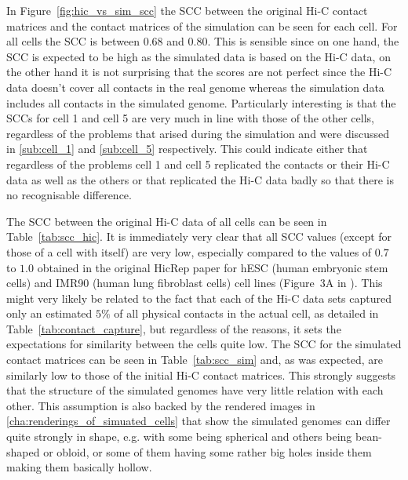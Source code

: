 In Figure~\ref{fig:hic_vs_sim_scc} the SCC between the original Hi-C contact matrices and the contact matrices of the simulation can be seen for each cell. For all cells the SCC is between 0.68 and 0.80. This is sensible since on one hand, the SCC is expected to be high as the simulated data is based on the Hi-C data, on the other hand it is not surprising that the scores are not perfect since the Hi-C data doesn’t cover all contacts in the real genome whereas the simulation data includes all contacts in the simulated genome. Particularly interesting is that the SCCs for cell 1 and cell 5 are very much in line with those of the other cells, regardless of the problems that arised during the simulation and were discussed in \ref{sub:cell_1} and \ref{sub:cell_5} respectively. This could indicate either that regardless of the problems cell 1 and cell 5 replicated the contacts or their Hi-C data as well as the others or that replicated the Hi-C data badly so that there is no recognisable difference.

The SCC between the original Hi-C data of all cells can be seen in Table~\ref{tab:scc_hic}. It is immediately very clear that all SCC values (except for those of a cell with itself) are very low, especially compared to the values of \(0.7\) to \(1.0\) obtained in the original HicRep paper for hESC (human embryonic stem cells) and IMR90 (human lung fibroblast cells) cell lines (Figure~3A in \cite{yang_hicrep_2017}). This might very likely be related to the fact that each of the Hi-C data sets captured only an estimated \(5\%\) of all physical contacts in the actual cell, as detailed in Table~\ref{tab:contact_capture}, but regardless of the reasons, it sets the expectations for similarity between the cells quite low. The SCC for the simulated contact matrices can be seen in Table~\ref{tab:scc_sim} and, as was expected, are similarly low to those of the initial Hi-C contact matrices. This strongly suggests that the structure of the simulated genomes have very little relation with each other. This assumption is also backed by the rendered images in \ref{cha:renderings_of_simuated_cells} that show the simulated genomes can differ quite strongly in shape, e.g. with some being spherical and others being bean-shaped or obloid, or some of them having some rather big holes inside them making them basically hollow.


